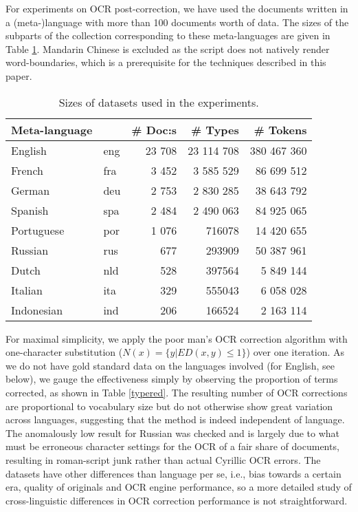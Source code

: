 \documentclass{sig-alternate}
\begin{document}
For experiments on OCR post-correction, we have used the documents
written in a (meta-)language with more than 100 documents worth of
data. The sizes of the subparts of the collection corresponding to
these meta-languages are given in Table \ref{collsize}.  Mandarin
Chinese is excluded as the script does not natively render
word-boundaries, which is a prerequisite for the techniques described
in this paper.

\begin{table}
\centering
\caption{Sizes of datasets used in the experiments.}
\label{collsize}
\begin{tabular}{l|l|r|r|r}
Meta-language & & \# Doc:s & \# Types & \# Tokens\\ \hline
English & eng & 23 708 & 23 114 708 & 380 467 360\\
French & fra & 3 452 & 3 585 529 & 86 699 512\\
German & deu & 2 753 & 2 830 285 & 38 643 792\\
Spanish & spa & 2 484 & 2 490 063 & 84 925 065\\
Portuguese & por & 1 076 & 716078 & 14 420 655\\
Russian & rus & 677 & 293909 & 50 387 961\\
Dutch & nld & 528 & 397564 & 5 849 144\\
Italian & ita & 329 & 555043 & 6 058 028\\
Indonesian & ind & 206 & 166524 & 2 163 114\\
\end{tabular}
\end{table}

For maximal simplicity, we apply the poor man's OCR correction
algorithm with one-character substitution ($N(x) = \{y|ED(x,y) \leq
1\}$) over one iteration. As we do not have gold standard data on the
languages involved (for English, see below), we gauge the
effectiveness simply by observing the proportion of terms corrected,
as shown in Table \ref{typered}. The resulting number of OCR
corrections are proportional to vocabulary size but do not otherwise
show great variation across languages, suggesting that the method is
indeed independent of language. The anomalously low result for Russian
was checked and is largely due to what must be erroneous character
settings for the OCR of a fair share of documents, resulting in
roman-script junk rather than actual Cyrillic OCR errors. The datasets
have other differences than language per se, i.e., bias towards a
certain era, quality of originals and OCR engine performance, so a
more detailed study of cross-linguistic differences in OCR correction
performance is not straightforward.
\end{document}
